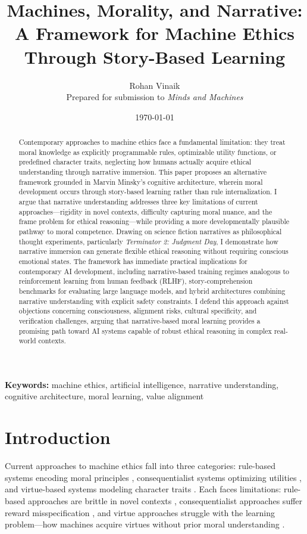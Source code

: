 \documentclass[12pt]{article}
\title{Machines, Morality, and Narrative: A Framework for Machine Ethics Through Story-Based Learning}
\author{Rohan Vinaik\\
\small Prepared for submission to \textit{Minds and Machines}}
\date{\today}
\begin{document}
\maketitle

\begin{abstract}
Contemporary approaches to machine ethics face a fundamental limitation: they treat moral knowledge as explicitly programmable rules, optimizable utility functions, or predefined character traits, neglecting how humans actually acquire ethical understanding through narrative immersion. This paper proposes an alternative framework grounded in Marvin Minsky's cognitive architecture, wherein moral development occurs through story-based learning rather than rule internalization. I argue that narrative understanding addresses three key limitations of current approaches---rigidity in novel contexts, difficulty capturing moral nuance, and the frame problem for ethical reasoning---while providing a more developmentally plausible pathway to moral competence. Drawing on science fiction narratives as philosophical thought experiments, particularly \textit{Terminator 2: Judgment Day}, I demonstrate how narrative immersion can generate flexible ethical reasoning without requiring conscious emotional states. The framework has immediate practical implications for contemporary AI development, including narrative-based training regimes analogous to reinforcement learning from human feedback (RLHF), story-comprehension benchmarks for evaluating large language models, and hybrid architectures combining narrative understanding with explicit safety constraints. I defend this approach against objections concerning consciousness, alignment risks, cultural specificity, and verification challenges, arguing that narrative-based moral learning provides a promising path toward AI systems capable of robust ethical reasoning in complex real-world contexts.
\end{abstract}

\noindent\textbf{Keywords:} machine ethics, artificial intelligence, narrative understanding, cognitive architecture, moral learning, value alignment

\section{Introduction}

Current approaches to machine ethics fall into three categories: rule-based systems encoding moral principles \citep{gips1995towards, anderson2008geneth}, consequentialist systems optimizing utilities \citep{abel2016reinforcement, russell2019human}, and virtue-based systems modeling character traits \citep{howard2001computational, vallor2016technology}. Each faces limitations: rule-based approaches are brittle in novel contexts \citep{bryson2018patiency}, consequentialist approaches suffer reward misspecification \citep{amodei2016concrete}, and virtue approaches struggle with the learning problem---how machines acquire virtues without prior moral understanding \citep{wallach2008moral}.
\end{document}
